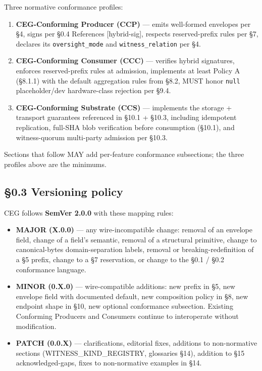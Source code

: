 \documentclass[10pt]{article}
\begin{document}
Three normative conformance profiles:


\begin{enumerate}\setlength\itemsep{0pt}
\item \textbf{CEG-Conforming Producer (CCP)} — emits well-formed envelopes per §4, signs per §0.4 References [hybrid-sig], respects reserved-prefix rules per §7, declares its \texttt{oversight\_mode} and \texttt{witness\_relation} per §4.
\item \textbf{CEG-Conforming Consumer (CCC)} — verifies hybrid signatures, enforces reserved-prefix rules at admission, implements at least Policy A (§8.1.1) with the default aggregation rules from §8.2, MUST honor \texttt{null} placeholder/dev hardware-class rejection per §9.4.
\item \textbf{CEG-Conforming Substrate (CCS)} — implements the storage + transport guarantees referenced in §10.1 + §10.3, including idempotent replication, full-SHA blob verification before consumption (§10.1), and witness-quorum multi-party admission per §10.3.
\end{enumerate}


Sections that follow MAY add per-feature conformance subsections; the three profiles above are the minimums.



\subsection*{§0.3 Versioning policy}


CEG follows \textbf{SemVer 2.0.0} with these mapping rules:


\begin{itemize}\setlength\itemsep{0pt}
\item \textbf{MAJOR (X.0.0)} — any wire-incompatible change: removal of an envelope field, change of a field's semantic, removal of a structural primitive, change to canonical-bytes domain-separation labels, removal or breaking-redefinition of a §5 prefix, change to a §7 reservation, or change to the §0.1 / §0.2 conformance language.
\item \textbf{MINOR (0.X.0)} — wire-compatible additions: new prefix in §5, new envelope field with documented default, new composition policy in §8, new endpoint shape in §10, new optional conformance subsection. Existing Conforming Producers and Consumers continue to interoperate without modification.
\item \textbf{PATCH (0.0.X)} — clarifications, editorial fixes, additions to non-normative sections (WITNESS\_KIND\_REGISTRY, glossaries §14), addition to §15 acknowledged-gaps, fixes to non-normative examples in §14.
\end{itemize}
\end{document}

